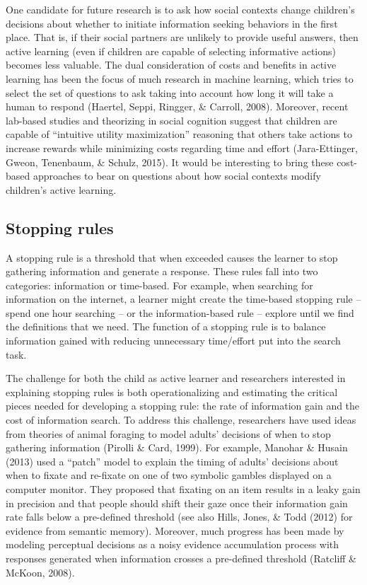 \documentclass[oneside]{report}
\begin{document}
One candidate for future research is to ask how social contexts change
children's decisions about whether to initiate information seeking
behaviors in the first place. That is, if their social partners are
unlikely to provide useful answers, then active learning (even if
children are capable of selecting informative actions) becomes less
valuable. The dual consideration of costs and benefits in active
learning has been the focus of much research in machine learning, which
tries to select the set of questions to ask taking into account how long
it will take a human to respond (Haertel, Seppi, Ringger, \& Carroll,
2008). Moreover, recent lab-based studies and theorizing in social
cognition suggest that children are capable of ``intuitive utility
maximization'' reasoning that others take actions to increase rewards
while minimizing costs regarding time and effort (Jara-Ettinger, Gweon,
Tenenbaum, \& Schulz, 2015). It would be interesting to bring these
cost-based approaches to bear on questions about how social contexts
modify children's active learning.

\subsection{Stopping rules}\label{stopping-rules}

A stopping rule is a threshold that when exceeded causes the learner to
stop gathering information and generate a response. These rules fall
into two categories: information or time-based. For example, when
searching for information on the internet, a learner might create the
time-based stopping rule -- spend one hour searching -- or the
information-based rule -- explore until we find the definitions that we
need. The function of a stopping rule is to balance information gained
with reducing unnecessary time/effort put into the search task.

The challenge for both the child as active learner and researchers
interested in explaining stopping rules is both operationalizing and
estimating the critical pieces needed for developing a stopping rule:
the rate of information gain and the cost of information search. To
address this challenge, researchers have used ideas from theories of
animal foraging to model adults' decisions of when to stop gathering
information (Pirolli \& Card, 1999). For example, Manohar \& Husain
(2013) used a ``patch'' model to explain the timing of adults' decisions
about when to fixate and re-fixate on one of two symbolic gambles
displayed on a computer monitor. They proposed that fixating on an item
results in a leaky gain in precision and that people should shift their
gaze once their information gain rate falls below a pre-defined
threshold (see also Hills, Jones, \& Todd (2012) for evidence from
semantic memory). Moreover, much progress has been made by modeling
perceptual decisions as a noisy evidence accumulation process with
responses generated when information crosses a pre-defined threshold
(Ratcliff \& McKoon, 2008).
\end{document}
